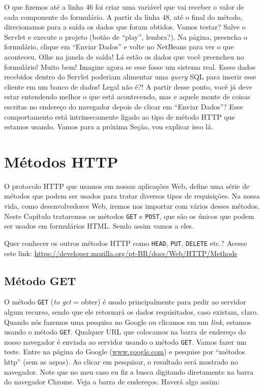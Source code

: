 O que fizemos até a linha 46 foi criar uma variável que vai receber o valor de cada componente do formulário. A partir da linha 48, até o final do método, direcionamos para a saída os dados que foram obtidos. Vamos testar? Salve o Servlet e execute o projeto (botão de ``play'', lembra?). Na página, preencha o formulário, clique em ``Enviar Dados'' e volte no NetBeans para ver o que aconteceu. Olhe na janela de saída! Lá estão os dados que você preencheu no formulário! Muito bem! Imagine agora se esse fosse um sistema real. Esses dados recebidos dentro do Servlet poderiam alimentar uma \textit{query} SQL para inserir esse cliente em um banco de dados! Legal não é?! A partir desse ponto, você já deve estar entendendo melhor o que está acontecendo, mas e aquele monte de coisas escritas no endereço do navegador depois de clicar em ``Enviar Dados''? Esse comportamento está intrinsecamente ligado ao tipo de método HTTP que estamos usando. Vamos para a próxima Seção, vou explicar isso lá.


\section{Métodos HTTP}

O protocolo HTTP que usamos em nossas aplicações Web, define uma série de métodos que podem ser usados para tratar diversos tipos de requisições. Na nossa vida, como desenvolvedores Web, iremos nos importar com vários desses métodos. Neste Capítulo trataremos os métodos \texttt{GET} e \texttt{POST}, que são os únicos que podem ser usados em formulários HTML. Sendo assim vamos a eles.

\begin{saibaMais}
    Quer conhecer os outros métodos HTTP como \texttt{HEAD}, \texttt{PUT}, \texttt{DELETE} etc.? Acesse este link: \url{https://developer.mozilla.org/pt-BR/docs/Web/HTTP/Methods}
\end{saibaMais}


\subsection{Método GET}

O método \texttt{GET} (\textit{to get} = obter) é usado principalmente para pedir ao servidor algum recurso, sendo que ele retornará os dados requisitados, caso existam, claro. Quando nós fazemos uma pesquisa no Google ou clicamos em um \textit{link}, estamos usando o método \texttt{GET}. Qualquer URL que colocamos na barra de endereço do nosso navegador é enviada ao servidor usando o método \texttt{GET}. Vamos fazer um teste. Entre na página do Google (\url{www.google.com}) e pesquise por ``métodos http'' (sem as aspas). Ao clicar em pesquisar, o resultado será mostrado no navegador. Note que no meu caso eu fiz a busca digitando diretamente na barra do navegador Chrome. Veja a barra de endereços. Haverá algo assim:

